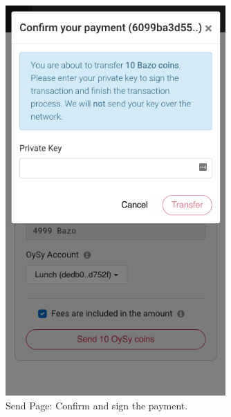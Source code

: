 \begin{figure}
\centering
\includegraphics[width=0.75\textwidth]{screenshots/Send-2.png}
\caption{\label{fig:uisend2}Send Page: Confirm and sign the payment.}
\end{figure}

